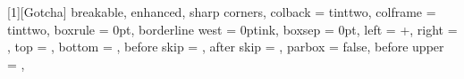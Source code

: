 \newenvironment{bookkeytakeaways}{%
  \par\needspace{5\baselineskip}\vspace{\tokBlockSkip}%
  \bookrule{\tokHairline}%
  \vspace{\tokCalloutPad}%
  \bookcalloutlabel{Key Takeaways}%
}{%
  \par\vspace{\tokCalloutPad}%
  \bookrule{\tokHairline}%
  \vspace{\tokBlockSkip}%
}

%
%
%

[1][Gotcha]{%
  breakable, enhanced, sharp corners,
  colback = tinttwo,
  colframe = tinttwo,
  boxrule = 0pt,
  borderline west = {\tokBarRule}{0pt}{ink},
  boxsep = 0pt,
  left = \dimexpr\tokBarRule+\tokCalloutPad\relax,
  right = \tokCalloutPad,
  top = \tokCalloutPad, bottom = \tokCalloutPad,
  before skip = \tokBlockSkip, after skip = \tokBlockSkip,
  parbox = false,
  before upper = \bookboxshape{},
}

%
%

